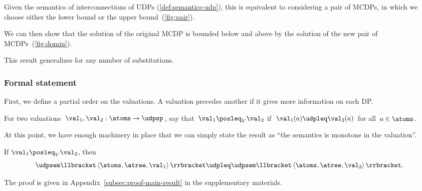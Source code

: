 \noindent Given the semantics of interconnections of UDPs (\cref{def:semantics-udp}),
this is equivalent to considering a pair of MCDPs, in which we choose
either the lower bound or the upper bound~(\cref{fig:pair}).
\begin{center}
\end{center}

\noindent We can then show that the solution of the original MCDP
is bounded below and above by the solution of the new pair of MCDPs~(\cref{fig:domin}).
\begin{center}
\end{center}

This result generalizes for any number of substitutions.

\subsubsection*{Formal statement}

First, we define a partial order on the valuations. A valuation precedes
another if it gives more information on each DP.
\begin{definition}
  \label{def:For-two-valuations,}For two valuations~$\val_{1},\val_{2}:\atoms\rightarrow\udpsp$,
  say that~$\val_{1}\posleq_{V}\val_{2}$ if~$\val_{1}(a)\udpleq\val_{2}(a)$
  for all~$a\in\atoms$.
\end{definition}
At this point, we have enough machinery in place that we can simply
state the result as ``the semantics is monotone in the valuation''.
\begin{theorem}
  \label{thm:udpsem-monotone}If $\val_{1}\posleq_{V}\val_{2}$, then
  \[
    \udpsem\llbracket\left\langle \atoms,\atree,\val_{1}\right\rangle \rrbracket\udpleq\udpsem\llbracket\left\langle \atoms,\atree,\val_{2}\right\rangle \rrbracket.
  \]
\end{theorem}
The proof is given in Appendix~\cref{subsec:proof-main-result}
in the supplementary materials.

